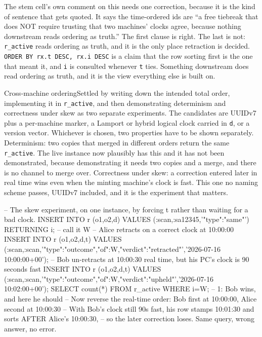 The stem cell's own comment on this needs one correction, because it is the kind of sentence that gets quoted. It says the time-ordered ids are ``a free tiebreak that does NOT require trusting that two machines' clocks agree, because nothing downstream reads ordering as truth.'' The first clause is right. The last is not: \texttt{r\_active} reads ordering as truth, and it is the only place retraction is decided. \texttt{ORDER BY rx.t DESC, rx.i DESC} is a claim that the row sorting first is the one that meant it, and \texttt{i} is consulted whenever \texttt{t} ties. Something downstream does read ordering as truth, and it is the view everything else is built on.

\begin{Open}{Cross-machine ordering}{Settled by writing down the intended total order, implementing it in \texttt{r\_active}, and then demonstrating determinism and correctness under skew as two separate experiments.}
The candidates are UUIDv7 plus a per-machine marker, a Lamport or hybrid logical clock carried in \texttt{d}, or a version vector. Whichever is chosen, two properties have to be shown separately. Determinism: two copies that merged in different orders return the same \texttt{r\_active}. The live instance now plausibly has this and it has not been demonstrated, because demonstrating it needs two copies and a merge, and there is no channel to merge over. Correctness under skew: a correction entered later in real time wins even when the minting machine's clock is fast. This one no naming scheme passes, UUIDv7 included, and it is the experiment that matters.
\begin{Check}
-- The skew experiment, on one instance, by forcing t rather than waiting for a bad clock.
INSERT INTO r (o1,o2,d) VALUES (:scan,:sa12345,'{"type":"same"}') RETURNING i;   -- call it W
-- Alice retracts on a correct clock at 10:00:00
INSERT INTO r (o1,o2,d,t) VALUES (:scan,:scan,'{"type":"outcome","of":W,"verdict":"retracted"}','2026-07-16 10:00:00+00');
-- Bob un-retracts at 10:00:30 real time, but his PC's clock is 90 seconds fast
INSERT INTO r (o1,o2,d,t) VALUES (:scan,:scan,'{"type":"outcome","of":W,"verdict":"upheld"}','2026-07-16 10:02:00+00');
SELECT count(*) FROM r_active WHERE i=W;   -- 1: Bob wins, and here he should
-- Now reverse the real-time order: Bob first at 10:00:00, Alice second at 10:00:30
-- With Bob's clock still 90s fast, his row stamps 10:01:30 and sorts AFTER Alice's 10:00:30,
-- so the later correction loses. Same query, wrong answer, no error.
\end{Check}
\end{Open}

